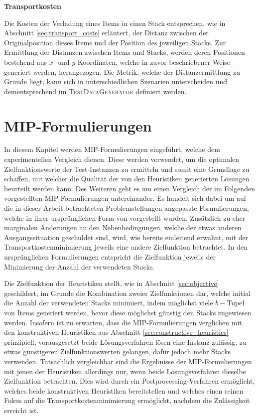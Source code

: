\textbf{Transportkosten}

Die Kosten der Verladung eines Items in einen Stack entsprechen, wie in Abschnitt \ref{sec:transport_costs}
erläutert, der Distanz zwischen der Originalposition dieses Items und der Position des jeweiligen Stacks.
Zur Ermittlung der Distanzen zwischen Items und Stacks, werden deren Positionen bestehend aus
$x$- und $y$-Koordinaten, welche in zuvor beschriebener Weise generiert werden, herangezogen.
Die Metrik, welche der Distanzermittlung zu Grunde liegt, kann sich in unterschiedlichen Szenarien
unterscheiden und dementsprechend im \textsc{TestDataGenerator} definiert werden.

\vfill

\pagebreak

\section{MIP-Formulierungen}
\label{sec:mip_formulations}

In diesem Kapitel werden MIP-Formulierungen eingeführt, welche dem experimentellen Vergleich dienen.
Diese werden verwendet, um die optimalen Zielfunktionswerte der Test-Instanzen zu ermitteln und somit eine Grundlage zu schaffen, mit welcher die Qualität der von den Heuristiken generierten Lösungen beurteilt werden kann. Des Weiteren geht es um einen Vergleich der im Folgenden vorgestellten MIP-Formulierungen untereinander.
Es handelt sich dabei um auf die in dieser Arbeit betrachteten Problemstellungen angepasste Formulierungen,
welche in ihrer ursprünglichen Form von \citet{Le2016} vorgestellt wurden.
Zusätzlich zu eher marginalen Änderungen an den Nebenbedingungen, welche der etwas anderen Ausgangssituation geschuldet sind,
wird, wie bereits einleitend erwähnt, mit der Transportkostenminimierung jeweils eine andere Zielfunktion betrachtet.
In den ursprünglichen Formulierungen entspricht die Zielfunktion jeweils der Minimierung der Anzahl der verwendeten Stacks.

Die Zielfunktion der Heuristiken stellt, wie in Abschnitt \ref{sec:objective} geschildert, im Grunde die Kombination
zweier Zielfunktionen dar, welche initial die Anzahl der verwendeten Stacks minimiert, indem möglichst viele
$b-$Tupel von Items generiert werden, bevor diese möglichst günstig den Stacks zugewiesen werden.
Insofern ist zu erwarten, dass die MIP-Formulierungen verglichen mit den konstruktiven Heuristiken
aus Abschnitt \ref{sec:constructive_heuristics} prinzipiell, vorausgesetzt beide Lösungsverfahren lösen eine
Instanz zulässig, zu etwas günstigeren Zielfunktionswerten gelangen, dafür jedoch mehr Stacks verwenden.
Tatsächlich vergleichbar sind die Ergebnisse der MIP-Formulierungen mit jenen der Heuristiken allerdings nur,
wenn beide Lösungsverfahren dieselbe Zielfunktion betrachten. Dies wird durch ein Postprocessing-Verfahren
ermöglicht, welches beide konstruktiven Heuristiken bereitstellen und welches einen reinen Fokus auf die
Transportkostenminimierung ermöglicht, nachdem die Zulässigkeit erreicht ist.

